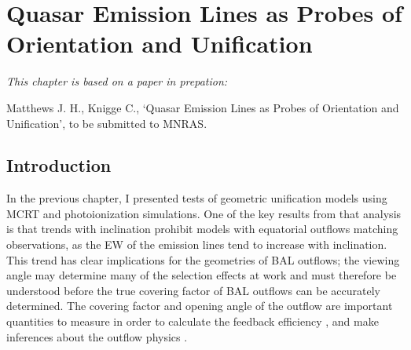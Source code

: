 \chapter{Quasar Emission Lines as Probes of Orientation and Unification}

\def\py{\textsc{python}}
\def\tar{\textsc{tardis}}
\def\cld{\textsc{cloudy}}
\def\agn{\textsc{agnspec}}
\def\kerrtrans{\textsc{kerrtrans}}


\def\civ{C~\textsc{iv}}
\def\nv{N~\textsc{v}}
\def\heii{He~\textsc{ii}}
\def\ovi{O~\textsc{vi}}
\def\la{Ly$\alpha$}
\def\ha{H$\alpha$}
\def\oiii{O~\textsc{iii}}
\def\oiiifull{O~\textsc{iii}~5007\AA}
\def\fwh{FWHM[H$\beta$]}
\def\ewo{EW[O~\textsc{iii}]}
\def\ept{$\epsilon(\theta)$}

\def\araa{ARAA}
\def\nat{Nature}
\def\apjl{ApJ Letters}
\def\aapr{AAPR}
\def\ssr{SSR}
\def\apj{ApJ}
\def\apjs{ApJs}
\def\pasp{PASP}
\def\aap{A\&A}
\def\mnras{MNRAS}
\def\aj{AJ}
\def\rmxaa{RMXAA}
\def\ew{{\rm EW}}

{\em This chapter is based on a paper in prepation:

Matthews J. H., Knigge C., 
`Quasar Emission Lines as Probes of Orientation and Unification',
to be submitted to MNRAS.}


%
%
\maketitle

\section{Introduction}

In the previous chapter, I presented tests of geometric unification
models using MCRT and photoionization simulations. 
One of the key results from that analysis is that trends with
inclination prohibit models with equatorial outflows matching
observations, as the EW of the emission lines tend
to increase with inclination. This trend has clear implications for
the geometries of BAL outflows; the viewing angle may determine many
of the selection effects at work and must therefore be understood
before the true covering factor of BAL outflows can be accurately 
determined. The covering factor and opening angle of the outflow
are important quantities to measure in order to calculate the
feedback efficiency \citep[e.g.][]{borguet2012}, 
and make inferences about the outflow physics \citep[e.g.][]{proga2005}. 

